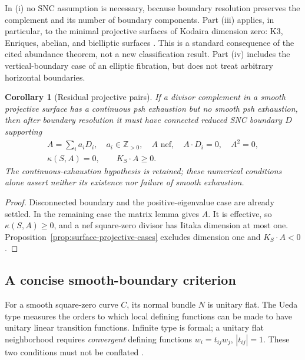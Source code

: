 \documentclass[11pt]{amsart}
\newtheorem{corollary}[theorem]{Corollary}
\theoremstyle{definition}
\theoremstyle{remark}
\numberwithin{equation}{section}
\begin{document}
In \textup{(i)} no SNC assumption is necessary, because boundary
resolution preserves the complement and its number of boundary
components. Part \textup{(iii)} applies, in particular, to the minimal
projective surfaces of Kodaira dimension zero: K3, Enriques, abelian,
and bielliptic surfaces \cite[Chapter~VI]{BHPV2004}. This is a standard
consequence of the cited abundance theorem, not a new classification
result. Part \textup{(iv)} includes the vertical-boundary case of an
elliptic fibration, but does not treat arbitrary horizontal boundaries.

\begin{corollary}[Residual projective pairs]
\label{cor:surface-connected-residual}
If a divisor complement in a smooth projective surface has a continuous
psh exhaustion but no smooth psh exhaustion, then after boundary
resolution it must have connected reduced SNC boundary $D$ supporting
\[
 \begin{gathered}
 A=\sum_i a_iD_i,\quad a_i\in\mathbb Z_{>0},\quad A\text{ nef},
 \quad A\cdot D_i=0,\quad A^2=0,\\
 \kappa(S,A)=0,\qquad K_S\cdot A\ge0.
 \end{gathered}
\]
The continuous-exhaustion hypothesis is retained; these numerical
conditions alone assert neither its existence nor failure of smooth
exhaustion.
\end{corollary}
\begin{proof}
Disconnected boundary and the positive-eigenvalue case are already
settled. In the remaining case the matrix lemma gives $A$. It is
effective, so $\kappa(S,A)\ge0$, and a nef square-zero divisor has
Iitaka dimension at most one. Proposition~\ref{prop:surface-projective-cases}
excludes dimension one and $K_S\cdot A<0$.
\end{proof}

\subsection{A concise smooth-boundary criterion}
\label{subsec:smooth-boundary}

For a smooth square-zero curve $C$, its normal bundle $N$ is unitary
flat. The Ueda type measures the orders to which local defining
functions can be made to have unitary linear transition functions.
Infinite type is formal; a unitary flat neighborhood requires
\emph{convergent} defining functions $w_i=t_{ij}w_j$, $|t_{ij}|=1$.
These two conditions must not be conflated \cite{Ueda1983,CLPT2018}.
\end{document}
